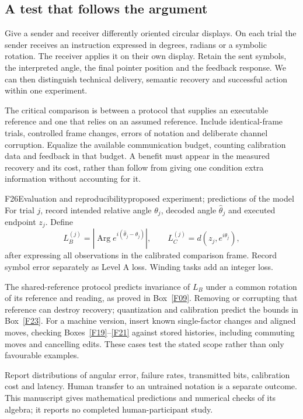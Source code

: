\documentclass[11pt,a4paper]{article}
\DeclareMathOperator{\Arg}{Arg}
\begin{document}
\subsection{A test that follows the argument}
Give a sender and receiver differently oriented circular displays. On each
trial the sender receives an instruction expressed in degrees, radians or a
symbolic rotation. The receiver applies it on their own display. Retain the
sent symbols, the interpreted angle, the final pointer position and the
feedback response. We can then distinguish technical delivery, semantic
recovery and successful action within one experiment.

The critical comparison is between a protocol that supplies an executable
reference and one that relies on an assumed reference. Include identical-frame
trials, controlled frame changes, errors of notation and deliberate channel
corruption. Equalize the available communication budget, counting calibration
data and feedback in that budget. A benefit must appear in the measured
recovery and its cost, rather than follow from giving one condition extra
information without accounting for it.

\begin{formal}{F26}{Evaluation and reproducibility}{proposed experiment; predictions of the model}
For trial $j$, record intended relative angle $\theta_j$, decoded angle
$\hat\theta_j$ and executed endpoint $z_j$. Define
\begin{equation}
 L_B^{(j)}=|\Arg e^{i(\hat\theta_j-\theta_j)}|,\qquad
 L_C^{(j)}=d(z_j,e^{i\theta_j}),
\end{equation}
after expressing all observations in the calibrated comparison frame. Record
symbol error separately as Level A loss. Winding tasks add an integer loss.

The shared-reference protocol predicts invariance of $L_B$ under a common
rotation of its reference and reading, as proved in Box~\ref{F09}.
Removing or corrupting that reference can destroy recovery; quantization
and calibration predict the bounds in Box~\ref{F23}. For a machine version,
insert known single-factor changes and aligned moves, checking
Boxes~\ref{F19}--\ref{F21} against stored histories, including commuting moves
and cancelling edits. These cases test the stated scope rather than only
favourable examples.

Report distributions of angular error, failure rates, transmitted bits,
calibration cost and latency. Human transfer to an untrained notation is a
separate outcome. This manuscript gives mathematical predictions and numerical
checks of its algebra; it reports no completed human-participant study.
\end{formal}
\end{document}
